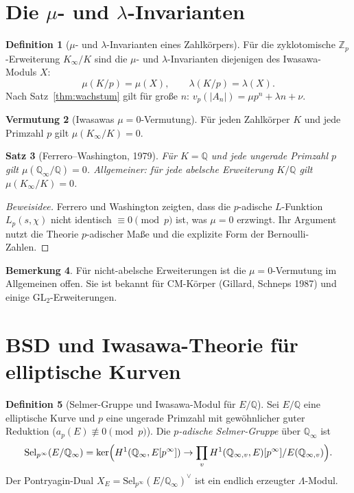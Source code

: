 \documentclass[12pt,a4paper]{amsart}
\newtheorem{theorem}{Satz}[section]
\theoremstyle{definition}
\newtheorem{definition}[theorem]{Definition}
\newtheorem{remark}[theorem]{Bemerkung}
\newtheorem{conjecture}[theorem]{Vermutung}
\newcommand{\Q}{\mathbb{Q}}
\newcommand{\Zp}{\mathbb{Z}_p}
\begin{document}
\section{Die $\mu$- und $\lambda$-Invarianten}

\begin{definition}[$\mu$- und $\lambda$-Invarianten eines Zahlkörpers]
\label{def:mu_lambda}
Für die zyklotomische $\Zp$-Erweiterung $K_\infty/K$ sind die
$\mu$- und $\lambda$-Invarianten diejenigen des Iwasawa-Moduls $X$:
\[
  \mu(K/p) = \mu(X), \qquad \lambda(K/p) = \lambda(X).
\]
Nach Satz~\ref{thm:wachstum} gilt für große $n$:
$v_p(|A_n|) = \mu p^n + \lambda n + \nu$.
\end{definition}

\begin{conjecture}[Iwasawas $\mu = 0$-Vermutung]
Für jeden Zahlkörper $K$ und jede Primzahl $p$ gilt
$\mu(K_\infty/K) = 0$.
\end{conjecture}

\begin{theorem}[Ferrero--Washington, 1979]
Für $K = \Q$ und jede ungerade Primzahl $p$ gilt $\mu(\Q_\infty/\Q) = 0$.
Allgemeiner: für jede abelsche Erweiterung $K/\Q$ gilt $\mu(K_\infty/K) = 0$.
\end{theorem}

\begin{proof}[Beweisidee]
Ferrero und Washington zeigten, dass die $p$-adische $L$-Funktion
$L_p(s, \chi)$ nicht identisch $\equiv 0 \pmod{p}$ ist, was $\mu = 0$
erzwingt.  Ihr Argument nutzt die Theorie $p$-adischer Maße und die
explizite Form der Bernoulli-Zahlen.
\end{proof}

\begin{remark}
Für nicht-abelsche Erweiterungen ist die $\mu = 0$-Vermutung im Allgemeinen
offen.  Sie ist bekannt für CM-Körper (Gillard, Schneps 1987) und einige
GL$_2$-Erweiterungen.
\end{remark}

\section{BSD und Iwasawa-Theorie für elliptische Kurven}

\begin{definition}[Selmer-Gruppe und Iwasawa-Modul für $E/\Q$]
\label{def:selmer_iwasawa}
Sei $E/\Q$ eine elliptische Kurve und $p$ eine ungerade Primzahl mit
gewöhnlicher guter Reduktion ($a_p(E) \not\equiv 0 \pmod{p}$).
Die \emph{$p$-adische Selmer-Gruppe} über $\Q_\infty$ ist
\[
  \mathrm{Sel}_{p^\infty}(E/\Q_\infty)
  = \ker\Bigl(H^1(\Q_\infty, E[p^\infty]) \to
    \prod_v H^1(\Q_{\infty,v}, E)[p^\infty]/E(\Q_{\infty,v})\Bigr).
\]
Der Pontryagin-Dual $X_E = \mathrm{Sel}_{p^\infty}(E/\Q_\infty)^\vee$
ist ein endlich erzeugter $\Lambda$-Modul.
\end{definition}
\end{document}
